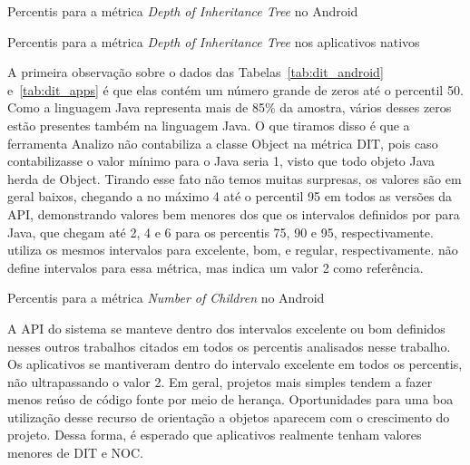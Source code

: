 \begin{table}[!htb]
\centering
{}

\caption{Percentis para a métrica \textit{Depth of Inheritance Tree} no Android}
\label{tab:dit_android}
\end{table}

\begin{table}[!htb]
\centering
{}

\caption{Percentis para a métrica \textit{Depth of Inheritance Tree} nos aplicativos nativos}
\label{tab:dit_apps}
\end{table}

A primeira observação sobre o dados das Tabelas~\ref{tab:dit_android} e~\ref{tab:dit_apps} é que elas contém um número grande de zeros até o percentil 50. Como a linguagem Java representa mais de 85\% da amostra, vários desses zeros estão presentes também na linguagem Java. O que tiramos disso é que a ferramenta Analizo não contabiliza a classe Object na métrica DIT, pois caso contabilizasse o valor mínimo para o Java seria 1, visto que todo objeto Java herda de Object. Tirando esse fato não temos muitas surpresas, os valores são em geral baixos, chegando a no máximo 4 até o percentil 95 em todos as versões da API, demonstrando valores bem menores dos que os intervalos definidos por  para Java, que chegam até 2, 4 e 6 para os percentis 75, 90 e 95, respectivamente.  utiliza os mesmos intervalos para excelente, bom, e regular, respectivamente.  não define intervalos para essa métrica, mas indica um valor 2 como referência. 

\begin{table}[!htb]
\centering
{}

\caption{Percentis para a métrica \textit{Number of Children} no Android}
\label{tab:noc_android}
\end{table}

A API do sistema se manteve dentro dos intervalos excelente ou bom definidos nesses outros trabalhos citados em todos os percentis analisados nesse trabalho. Os aplicativos se mantiveram dentro do intervalo excelente em todos os percentis, não ultrapassando o valor 2. Em geral, projetos mais simples tendem a fazer menos reúso de código fonte por meio de herança. Oportunidades para uma boa utilização desse recurso de orientação a objetos aparecem com o crescimento do projeto. Dessa forma, é esperado que aplicativos realmente tenham valores menores de DIT e NOC.

